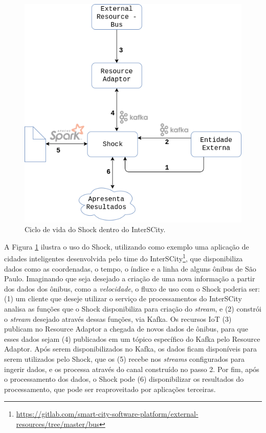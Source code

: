 \pagebreak

\begin{figure}[hbt]
  \centering
    \includegraphics[scale=0.45]{figuras/shock.png}
    \caption{Ciclo de vida do Shock dentro do InterSCity.}
  \label{fig:shock}
\end{figure}

A Figura \ref{fig:shock} ilustra o uso do Shock, utilizando como exemplo uma
aplicação de cidades inteligentes desenvolvida pelo time do
InterSCity\footnote{\url{https://gitlab.com/smart-city-software-platform/external-resources/tree/master/bus}},
que disponibiliza dados como as coordenadas, o tempo, o índice e a linha de
alguns ônibus de São Paulo. Imaginando que seja desejado a criação de uma nova
informação a partir dos dados dos ônibus, como a \textit{velocidade}, o fluxo
de uso com o Shock poderia ser: (1) um cliente que deseje utilizar o serviço
de processamentos do InterSCity analisa as funções que o Shock disponibiliza
para criação do \textit{stream}, e (2) constrói o \textit{stream} desejado através
dessas funções, via Kafka. Os recursos IoT (3) publicam no Resource Adaptor a
chegada de novos dados de ônibus, para que esses dados sejam (4) publicados em
um tópico específico do Kafka pelo Resource Adaptor. Após serem disponibilizados
no Kafka, os dados ficam disponíveis para serem utilizados pelo Shock, que os (5)
recebe nos \textit{streams} configurados para ingerir dados, e os processa
através do canal construído no passo 2. Por fim, após o
processamento dos dados, o Shock pode (6) disponibilizar os resultados do
processamento, que pode ser reaproveitado por aplicações terceiras.


